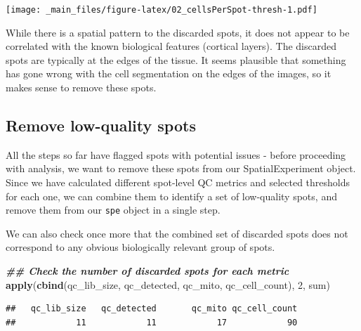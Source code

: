 \documentclass[
]{book}
\newenvironment{Shaded}{\begin{snugshade}}{\end{snugshade}}
\newcommand{\AttributeTok}[1]{\textcolor[rgb]{0.13,0.29,0.53}{#1}}
\newcommand{\DecValTok}[1]{\textcolor[rgb]{0.00,0.00,0.81}{#1}}
\newcommand{\DocumentationTok}[1]{\textcolor[rgb]{0.56,0.35,0.01}{\textbf{\textit{#1}}}}
\newcommand{\FunctionTok}[1]{\textcolor[rgb]{0.13,0.29,0.53}{\textbf{#1}}}
\newcommand{\NormalTok}[1]{#1}
\newcommand{\OtherTok}[1]{\textcolor[rgb]{0.56,0.35,0.01}{#1}}
\newcommand{\SpecialCharTok}[1]{\textcolor[rgb]{0.81,0.36,0.00}{\textbf{#1}}}
\newcommand{\StringTok}[1]{\textcolor[rgb]{0.31,0.60,0.02}{#1}}
\begin{document}
\texttt{[image: \_main\_files/figure-latex/02\_cellsPerSpot-thresh-1.pdf]}

While there is a spatial pattern to the discarded spots, it does not appear to be correlated with the known biological features (cortical layers). The discarded spots are typically at the edges of the tissue. It seems plausible that something has gone wrong with the cell segmentation on the edges of the images, so it makes sense to remove these spots.

\hypertarget{remove-low-quality-spots}{%
\subsection{Remove low-quality spots}\label{remove-low-quality-spots}}

All the steps so far have flagged spots with potential issues - before proceeding with analysis, we want to remove these spots from our SpatialExperiment object. Since we have calculated different spot-level QC metrics and selected thresholds for each one, we can combine them to identify a set of low-quality spots, and remove them from our \texttt{spe} object in a single step.

We can also check once more that the combined set of discarded spots does not correspond to any obvious biologically relevant group of spots.

\begin{Shaded}
\begin{Highlighting}[]
\DocumentationTok{\#\# Check the number of discarded spots for each metric}
\FunctionTok{apply}\NormalTok{(}\FunctionTok{cbind}\NormalTok{(qc\_lib\_size, qc\_detected, qc\_mito, qc\_cell\_count), }\DecValTok{2}\NormalTok{, sum)}
\end{Highlighting}
\end{Shaded}

\begin{verbatim}
##   qc_lib_size   qc_detected       qc_mito qc_cell_count 
##            11            11            17            90
\end{verbatim}

\begin{Shaded}
\end{Shaded}
\end{document}
